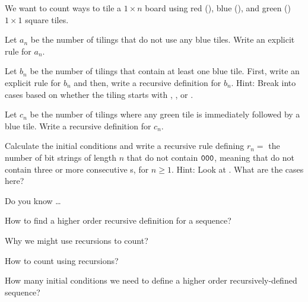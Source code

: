 \begin{exer}[\exerU] %
\label{exer_count_colored_tilings_first}
    We want to count ways to tile a $1 \times n$ board using red (), blue (), and green () $1 \times 1 $ square tiles.
        \begin{apart}
            \item \label{part_red_green_tiles} Let $a_n$ be the number of tilings that do not use any blue tiles. Write an explicit rule for $a_n$.
            
            \item Let $b_n$ be the number of tilings that contain at least one blue tile. First, write an explicit rule for $b_n$ and then, write a recursive definition for $b_n$.  Hint: Break into cases based on whether the tiling starts with , , or .
            
            \item Let $c_n$ be the number of tilings where any green tile is immediately followed by a blue tile. Write a recursive definition for $c_n$.  %
        \end{apart}
\end{exer}

\begin{exer}[\exerU] %
\label{exer_bs_without_000}
   Calculate the initial conditions and write a recursive rule defining $r_n=$ the number of bit strings of length $n$ that do not contain $\texttt{000}$, meaning that do not contain three or more consecutive s, for $n \ge 1$.  Hint: Look at .  What are the cases here?
\end{exer}

\begin{exer}[\exerR] %
\label{exer_dyk_model_higher_rec}
    Do you know \ldots
        \begin{exerpart}
            \item How to find a higher order recursive definition for a sequence?
            \item Why we might use recursions to count?
            \item How to count using recursions?
            \item How many initial conditions we need to define a higher order recursively-defined sequence?
        \end{exerpart}
\end{exer}

